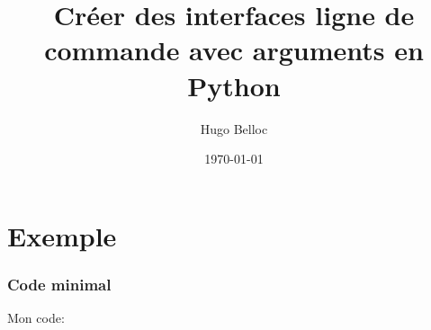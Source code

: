 \documentclass{beamer}
\title[Le module argparse]{Créer des interfaces ligne de commande avec arguments en Python}
\author{Hugo Belloc}
\date{\today}
\begin{document}


\begin{frame}
 \titlepage
\end{frame}

\begin{frame}
 \tableofcontents
\end{frame}

% 
%  
%  
%  
% 
% 
% 

\section{Exemple}
\begin{frame}
 \frametitle{Code minimal}
 
 Mon code:
  
\inputminted[linenos=true, fontsize=\fontsize{7}{8}]{python}{py_src/py_argparse/argparse_minimal.py}

\end{frame}
\end{document}
